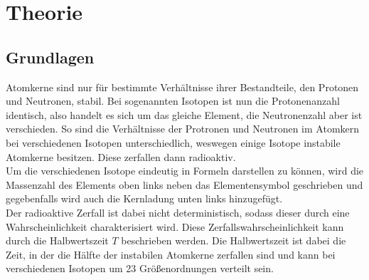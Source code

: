 \section{Theorie}
\label{sec:Theorie}
\subsection{Grundlagen}
\label{sec:Grundlagen}
Atomkerne sind nur für bestimmte Verhältnisse ihrer Bestandteile, den Protonen und Neutronen, stabil.
Bei sogenannten Isotopen ist nun die Protonenanzahl identisch, also handelt es sich um das gleiche 
Element, die Neutronenzahl aber ist verschieden. So sind die Verhältnisse der Protronen und Neutronen
im Atomkern bei verschiedenen Isotopen unterschiedlich, weswegen einige Isotope instabile Atomkerne
besitzen. Diese zerfallen dann radioaktiv.\\
Um die verschiedenen Isotope eindeutig in Formeln darstellen zu können, wird die Massenzahl des Elements
oben links neben das Elementensymbol geschrieben und gegebenfalls wird auch die Kernladung unten links 
hinzugefügt.\\
Der radioaktive Zerfall ist dabei nicht deterministisch, sodass dieser durch eine Wahrscheinlichkeit 
charakterisiert wird. Diese Zerfallswahrscheinlichkeit kann durch die Halbwertszeit $T$ beschrieben 
werden. Die Halbwertszeit ist dabei die Zeit, in der die Hälfte der instabilen Atomkerne zerfallen sind
und kann bei verschiedenen Isotopen um 23 Größenordnungen verteilt sein.\\
